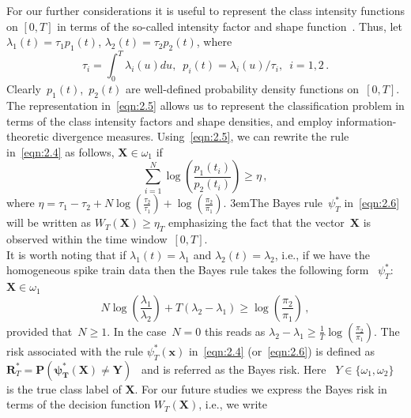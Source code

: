 \documentclass[lettersize,journal,onecolumn]{IEEEtran}
\theoremstyle{definition}
\newcommand{\parastretch}{\emergencystretch 3em}
\begin{document}
For our further considerations it is useful to represent the class intensity functions 
on $[0,T]$ in terms of the so-called intensity factor and shape 
function~\cite{gajardo2021cox}. 
Thus, let \mbox{$\lambda_{1}(t)=\tau_{1}p_{1}(t)$}, 
\mbox{$\lambda_{2}(t)=\tau_{2}p_{2}(t)$}, where 
\begin{equation}
	\tau_{i}=\int_{0}^{T}\lambda_{i}(u)du ,\enspace p_{i}(t)=\lambda_{i}(u)/\tau_{i} ,\enspace
	i=1,2
	\label{eqn:2.5} \,.
\end{equation}
Clearly~$p_{1}(t)$,~$p_{2}(t)$ are well-defined probability density functions 
on~$[0,T]$. The 
representation in~\eqref{eqn:2.5} allows us to represent the classification problem in 
terms of the class intensity factors and shape densities, and employ 
information-theoretic divergence measures. Using~\eqref{eqn:2.5}, we can 
rewrite the rule in~\eqref{eqn:2.4} as follows, \mbox{$\mathbf{X}\in\omega_{1}$} if 
\begin{equation}
	\sum_{i=1}^{N}\log\left(
	\frac{p_{1}(t_{i})}{p_{2}(t_{i})}
	\right)
	\geq\eta
	\label{eqn:2.6} \,,
\end{equation}
where \mbox{$
	\eta=
	\tau_{1} - \tau_{2} + 
	N\log\left(\frac{\tau_{2}}{\tau_{1}}\right) +
	\log\left(\frac{\pi_{2}}{\pi_{1}}\right)
	$}. 
\parastretch The Bayes rule~$\psi_{T}^{*}$ in~\eqref{eqn:2.6} will be written as 
\mbox{$W_T(\mathbf{X})\geq\eta_T$} emphasizing the fact that the vector~$\mathbf{X}$ is
observed within the time window~$[0,T]$. \\
It is worth noting that if \mbox{$\lambda_{1}(t)=\lambda_{1}$} and
\mbox{$\lambda_{2}(t)=\lambda_{2}$}, i.e., if we have the homogeneous spike train data 
then the Bayes rule takes the following form \mbox{
	$\psi_{T}^{*}$: $\mathbf{X}\in\omega_{1}$
}
\begin{equation}
	N \log \left(\frac{\lambda_{1}}{\lambda_{2}}\right) + 
	T \left(\lambda_{2}-\lambda_{1}\right) 
	\geq \log \left(\frac{\pi_{2}}{\pi_{1}}\right)
	\label{eqn:2.7} \,,
\end{equation}
provided that~$N\geq1$. In the case~$N=0$ this reads as
$
\lambda_{2}-\lambda_{1} \geq \frac{1}{T} \log \left(\frac{\pi_{2}}{\pi_{1}}\right)
$. The risk associated with the rule \mbox{$\psi_{T}^{*}(\mathbf{x})$} 
in~\eqref{eqn:2.4} (or~\eqref{eqn:2.6}) is defined as \mbox{
	$\mathbf{R}_{T}^{*}=\mathbf{P(\psi_{T}^{*}(\mathbf{X})\neq Y)}$	
} and is referred as the Bayes risk. Here \mbox{
	$Y\in \{\omega_{1}, \omega_{2}\}$
} is the true class label of $\mathbf{X}$. For our future studies we express the 
Bayes risk in terms of the decision function $W_T(\mathbf{X})$, i.e., we write
\end{document}
